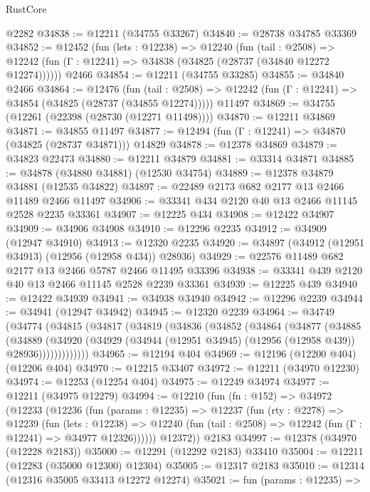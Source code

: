 \begin{lexlean}{RustCore}
\begin{coremodule}
    @2282
@34838 := @12211 (@34755 @33267)
@34840 := @28738 @34785 @33369
@34852 := @12452
    (fun (lets : @12238) =>
    @12240
      (fun (tail : @2508) =>
      @12242 (fun (Γ : @12241) => @34838 (@34825 (@28737 (@34840 @12272 @12274))))))
    @2466
@34854 := @12211 (@34755 @33285)
@34855 := @34840 @2466
@34864 := @12476
    (fun (tail : @2508) => @12242 (fun (Γ : @12241) => @34854 (@34825 (@28737 (@34855 @12274)))))
    @11497
@34869 := @34755 (@12261 (@22398 (@28730 (@12271 @11498))))
@34870 := @12211 @34869
@34871 := @34855 @11497
@34877 := @12494 (fun (Γ : @12241) => @34870 (@34825 (@28737 @34871))) @14829
@34878 := @12378 @34869
@34879 := @34823 @22473
@34880 := @12211 @34879
@34881 := @33314 @34871
@34885 := @34878 (@34880 @34881) (@12530 @34754)
@34889 := @12378 @34879 @34881 (@12535 @34822)
@34897 := @22489 @2173 @682 @2177 @13 @2466 @11489 @2466 @11497
@34906 := @33341 @434 @2120 @40 @13 @2466 @11145 @2528 @2235 @33361
@34907 := @12225 @434
@34908 := @12422 @34907
@34909 := @34906 @34908
@34910 := @12296 @2235
@34912 := @34909 (@12947 @34910)
@34913 := @12320 @2235
@34920 := @34897 (@34912 (@12951 @34913) (@12956 (@12958 @434)) @28936)
@34929 := @22576 @11489 @682 @2177 @13 @2466 @5787 @2466 @11495 @33396
@34938 := @33341 @439 @2120 @40 @13 @2466 @11145 @2528 @2239 @33361
@34939 := @12225 @439
@34940 := @12422 @34939
@34941 := @34938 @34940
@34942 := @12296 @2239
@34944 := @34941 (@12947 @34942)
@34945 := @12320 @2239
@34964 := @34749
    (@34774
      (@34815
        (@34817
          (@34819
            (@34836
              (@34852
                (@34864
                  (@34877
                    (@34885
                      (@34889
                        (@34920
                          (@34929 (@34944 (@12951 @34945) (@12956 (@12958 @439)) @28936)))))))))))))
@34965 := @12194 @404
@34969 := @12196 (@12200 @404) (@12206 @404)
@34970 := @12215 @33407
@34972 := @12211 (@34970 @12230)
@34974 := @12253 (@12254 @404)
@34975 := @12249 @34974
@34977 := @12211 (@34975 @12279)
@34994 := @12210
    (fun (fn : @152) =>
    @34972
      (@12233
        (@12236
          (fun (params : @12235) =>
          @12237
            (fun (rty : @2278) =>
            @12239
              (fun (lets : @12238) =>
              @12240 (fun (tail : @2508) => @12242 (fun (Γ : @12241) => @34977 @12326))))))
        @12372))
    @2183
@34997 := @12378 (@34970 (@12228 @2183))
@35000 := @12291 (@12292 @2183) @33410
@35004 := @12211 (@12283 (@35000 @12300) @12304)
@35005 := @12317 @2183
@35010 := @12314 (@12316 @35005 @33413 @12272 @12274)
@35021 := fun (params : @12235) =>

\end{coremodule}
\end{lexlean}
